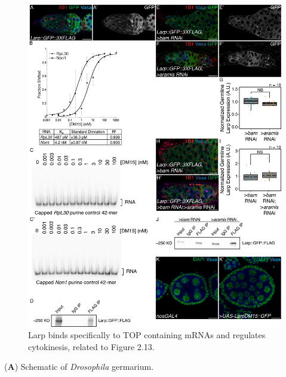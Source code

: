 \documentclass[12pt,oneside]{reedthesis}
\begin{document}
\begin{figure}

{\centering \includegraphics[width=6.5 in,height=8.9375 in]{./figure/Ribosome Biogenesis/Ribosome Biogenesis 7S} 

}

\caption[RNA helicases Aramis, Athos and Porthos are required for GSC differentiation.]{Larp binds specifically to TOP containing mRNAs and regulates cytokinesis, related to Figure 2.13.}\label{fig:unnamed-chunk-19}
\end{figure}
(\textbf{A}) Schematic of \emph{Drosophila} germarium.
\end{document}
